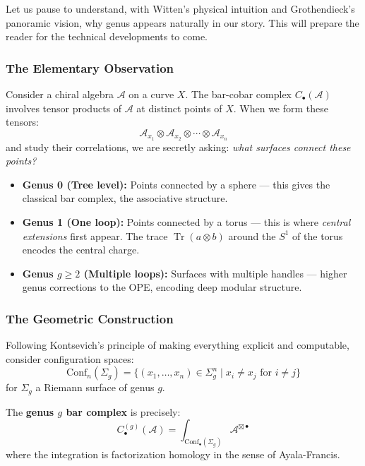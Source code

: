 \begin{example}
Let us pause to understand, with Witten's physical intuition and Grothendieck's
panoramic vision, why genus appears naturally in our story. This will prepare
the reader for the technical developments to come.

\subsubsection{The Elementary Observation}

Consider a chiral algebra $\mathcal{A}$ on a curve $X$. The bar-cobar complex
$C_{\bullet}(\mathcal{A})$ involves tensor products of $\mathcal{A}$ at distinct
points of $X$. When we form these tensors:
$$\mathcal{A}_{x_1} \otimes \mathcal{A}_{x_2} \otimes \cdots \otimes \mathcal{A}_{x_n}$$
and study their correlations, we are secretly asking: \emph{what surfaces connect
these points?}

\begin{itemize}
\item \textbf{Genus 0 (Tree level):} Points connected by a sphere --- this gives
the classical bar complex, the associative structure.

\item \textbf{Genus 1 (One loop):} Points connected by a torus --- this is where
\emph{central extensions} first appear. The trace $\operatorname{Tr}(a \otimes b)$
around the $S^1$ of the torus encodes the central charge.

\item \textbf{Genus $g \geq 2$ (Multiple loops):} Surfaces with multiple handles ---
higher genus corrections to the OPE, encoding deep modular structure.
\end{itemize}

\subsubsection{The Geometric Construction}

Following Kontsevich's principle of making everything explicit and computable,
consider configuration spaces:
$$\mathrm{Conf}_n(\Sigma_g) = \{ (x_1, \ldots, x_n) \in \Sigma_g^n \mid x_i \neq x_j \text{ for } i \neq j \}$$
for $\Sigma_g$ a Riemann surface of genus $g$.

The \textbf{genus $g$ bar complex} is precisely:
$$C_{\bullet}^{(g)}(\mathcal{A}) = \int_{\mathrm{Conf}_{\bullet}(\Sigma_g)} 
\mathcal{A}^{\boxtimes \bullet}$$
where the integration is factorization homology in the sense of Ayala-Francis.


\end{example}
